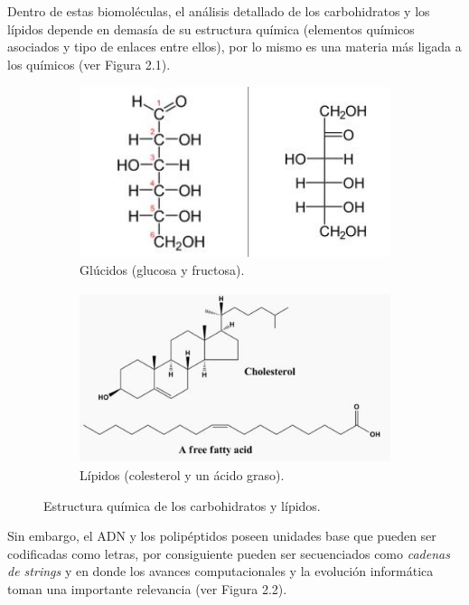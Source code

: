 Dentro de estas biomoléculas, el análisis detallado de los carbohidratos y los lípidos depende en demasía de su estructura química (elementos químicos asociados y tipo de enlaces entre ellos), por lo mismo es una materia más ligada a los químicos (ver Figura 2.1). 

\begin{figure}[H] 

\begin{subfigure}{0.5\textwidth}
\includegraphics[width=0.9\linewidth, height=5cm]{./images/glucidoejemplos} 
\caption{Glúcidos (glucosa y fructosa).}
\label{fig:subim1}
\end{subfigure}
\begin{subfigure}{0.4\textwidth}
\includegraphics[width=1\linewidth, height=5cm]{./images/lipidosejemplos}
\caption{Lípidos (colesterol y un ácido graso).}
\label{fig:subim2}
\end{subfigure}
 
\caption{Estructura química de los carbohidratos y lípidos.}
\label{fig:image1}
\end{figure}

Sin embargo, el ADN y los polipéptidos poseen unidades base que pueden ser codificadas como letras, por consiguiente pueden ser secuenciados como {\it{cadenas de strings}} y en donde los avances computacionales y la evolución informática toman una importante relevancia (ver Figura 2.2).

